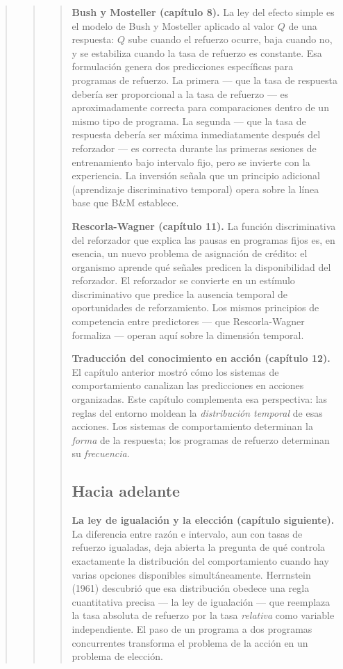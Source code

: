 \documentclass[
  letterpaper,
  DIV=11,
  numbers=noendperiod]{scrreprt}
\begin{document}
\begin{tcolorbox}[enhanced jigsaw, arc=.35mm, bottomrule=.15mm, breakable, colback=white, colframe=quarto-callout-note-color-frame, left=2mm, leftrule=.75mm, opacityback=0, rightrule=.15mm, toprule=.15mm]
\begin{quote}
\begin{quote}
\begin{quote}
\textbf{Bush y Mosteller (capítulo 8).} La ley del efecto simple es el
modelo de Bush y Mosteller aplicado al valor \(Q\) de una respuesta:
\(Q\) sube cuando el refuerzo ocurre, baja cuando no, y se estabiliza
cuando la tasa de refuerzo es constante. Esa formulación genera dos
predicciones específicas para programas de refuerzo. La primera --- que
la tasa de respuesta debería ser proporcional a la tasa de refuerzo ---
es aproximadamente correcta para comparaciones dentro de un mismo tipo
de programa. La segunda --- que la tasa de respuesta debería ser máxima
inmediatamente después del reforzador --- es correcta durante las
primeras sesiones de entrenamiento bajo intervalo fijo, pero se invierte
con la experiencia. La inversión señala que un principio adicional
(aprendizaje discriminativo temporal) opera sobre la línea base que B\&M
establece.

\textbf{Rescorla-Wagner (capítulo 11).} La función discriminativa del
reforzador que explica las pausas en programas fijos es, en esencia, un
nuevo problema de asignación de crédito: el organismo aprende qué
señales predicen la disponibilidad del reforzador. El reforzador se
convierte en un estímulo discriminativo que predice la ausencia temporal
de oportunidades de reforzamiento. Los mismos principios de competencia
entre predictores --- que Rescorla-Wagner formaliza --- operan aquí
sobre la dimensión temporal.

\textbf{Traducción del conocimiento en acción (capítulo 12).} El
capítulo anterior mostró cómo los sistemas de comportamiento canalizan
las predicciones en acciones organizadas. Este capítulo complementa esa
perspectiva: las reglas del entorno moldean la \emph{distribución
temporal} de esas acciones. Los sistemas de comportamiento determinan la
\emph{forma} de la respuesta; los programas de refuerzo determinan su
\emph{frecuencia}.

\mbox{}%
\subsection{Hacia adelante}\label{hacia-adelante-1}

\textbf{La ley de igualación y la elección (capítulo siguiente).} La
diferencia entre razón e intervalo, aun con tasas de refuerzo igualadas,
deja abierta la pregunta de qué controla exactamente la distribución del
comportamiento cuando hay varias opciones disponibles simultáneamente.
Herrnstein (1961) descubrió que esa distribución obedece una regla
cuantitativa precisa --- la ley de igualación --- que reemplaza la tasa
absoluta de refuerzo por la tasa \emph{relativa} como variable
independiente. El paso de un programa a dos programas concurrentes
transforma el problema de la acción en un problema de elección.


\end{quote}
\end{quote}
\end{quote}
\end{tcolorbox}
\end{document}
